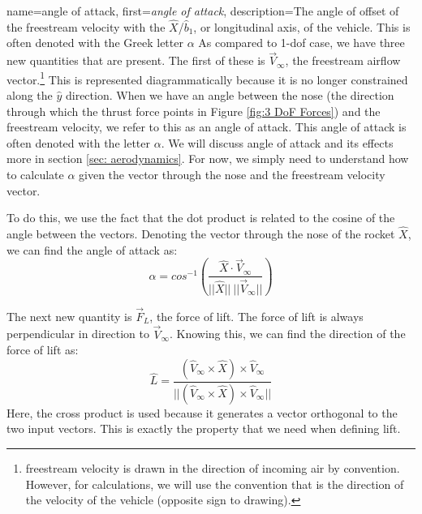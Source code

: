\documentclass[12pt]{report}
\begin{document}
{
    name=angle of attack,
    first={\textit{angle of attack}},
    description={The angle of offset of the freestream velocity with the $\hat{X}$/$\hat{b}_1$, or longitudinal axis, of the vehicle. This is often denoted with the Greek letter $\alpha$}
}
As compared to 1-\gls{dof} case, we have three new quantities that are present. The first of these is $\vec{V}_{\infty}$, the freestream airflow vector.\footnote{\gls{freestream} velocity  is drawn in the direction of incoming air by convention. However, for calculations, we will use the convention that  is the direction of the velocity of the vehicle (opposite sign to drawing).} This is represented diagrammatically because it is no longer constrained along the $\hat{y}$ direction. When we have an angle between the nose (the direction through which the thrust force points in Figure \ref{fig:3 DoF Forces}) and the \gls{freestream} velocity, we refer to this as an \gls{angle of attack}. This \gls{angle of attack} is often denoted with the letter $\alpha$. We will discuss \gls{angle of attack} and its effects more in section \ref{sec: aerodynamics}. For now, we simply need to understand how to calculate $\alpha$ given the vector through the nose and the \gls{freestream} velocity vector.

To do this, we use the fact that the dot product is related to the cosine of the angle between the vectors. Denoting the vector through the nose of the rocket $\hat{X}$, we can find the \gls{angle of attack} as:
\begin{equation}\label{eq:alpha}
    \alpha=cos^{-1}\left(\frac{\hat{X}\cdot \vec{V}_{\infty}}{||\hat{X}||\ ||\vec{V}_{\infty}||}\right)
\end{equation}

The next new quantity is $\vec{F}_L$, the force of lift. The force of lift is always perpendicular in direction to $\vec{V}_{\infty}$. Knowing this, we can find the direction of the force of lift as:
\begin{equation}\label{eq:Lift}
    \hat{L}=\frac{(\hat{V}_{\infty} \times \hat{X}) \times \hat{V}_{\infty}}{||(\hat{V}_{\infty} \times \hat{X}) \times \hat{V}_{\infty}||}
\end{equation}
Here, the cross product is used because it generates a vector orthogonal to the two input vectors. This is exactly the property that we need when defining lift.
\end{document}

